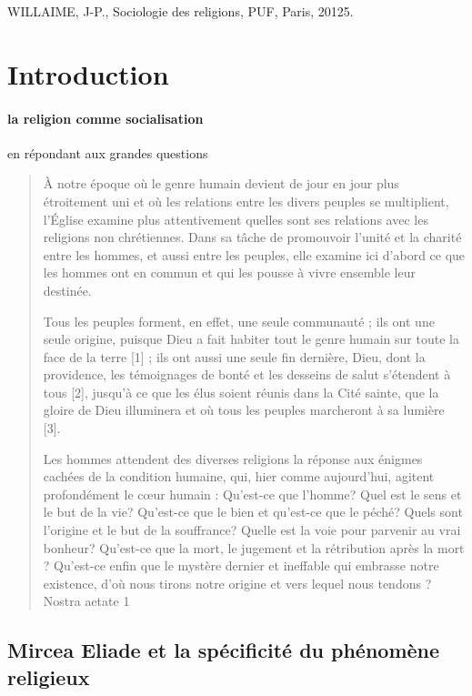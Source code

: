 WILLAIME, J-P., Sociologie des religions, PUF, Paris, 20125. 



\section{Introduction}
\paragraph{la religion comme socialisation} en répondant aux grandes questions

\begin{quote}

À notre époque où le genre humain devient de jour en jour plus étroitement uni et où les relations entre les divers peuples se multiplient, l’Église examine plus attentivement quelles sont ses relations avec les religions non chrétiennes. Dans sa tâche de promouvoir l’unité et la charité entre les hommes, et aussi entre les peuples, elle examine ici d’abord ce que les hommes ont en commun et qui les pousse à vivre ensemble leur destinée.

Tous les peuples forment, en effet, une seule communauté ; ils ont une seule origine, puisque Dieu a fait habiter tout le genre humain sur toute la face de la terre [1] ; ils ont aussi une seule fin dernière, Dieu, dont la providence, les témoignages de bonté et les desseins de salut s’étendent à tous [2], jusqu’à ce que les élus soient réunis dans la Cité sainte, que la gloire de Dieu illuminera et où tous les peuples marcheront à sa lumière [3].

Les hommes attendent des diverses religions la réponse aux énigmes cachées de la condition humaine, qui, hier comme aujourd’hui, agitent profondément le cœur humain : Qu’est-ce que l’homme? Quel est le sens et le but de la vie? Qu’est-ce que le bien et qu’est-ce que le péché? Quels sont l’origine et le but de la souffrance? Quelle est la voie pour parvenir au vrai bonheur? Qu’est-ce que la mort, le jugement et la rétribution après la mort ? Qu’est-ce enfin que le mystère dernier et ineffable qui embrasse notre existence, d’où nous tirons notre origine et vers lequel nous tendons ?
    Nostra aetate 1
\end{quote}

\subsection{Mircea Eliade et la spécificité du phénomène religieux }

